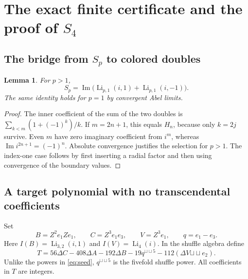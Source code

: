 \documentclass[11pt,letterpaper]{article}
\numberwithin{equation}{section}
\newtheorem{lemma}[theorem]{Lemma}
\theoremstyle{definition}
\DeclareMathOperator{\Li}{Li}
\DeclareMathOperator{\Imag}{Im}
\newcommand{\sh}{\mathbin{\sha}}
\providecommand{\sha}{\mathbin{\sqcup\!\sqcup}}
\begin{document}
\section{The exact finite certificate and the proof of \texorpdfstring{$S_4$}{S4}}
\label{sec:certificate}

\subsection{The bridge from \texorpdfstring{$S_p$}{Sp} to colored doubles}
\begin{lemma}\label{lem:bridge}
For $p>1$,
\begin{equation}
 S_p=\Imag\bigl(\Li_{p,1}(i,1)+\Li_{p,1}(i,-1)\bigr).
 \label{eq:bridge}
\end{equation}
The same identity holds for $p=1$ by convergent Abel limits.
\end{lemma}
\begin{proof}
The inner coefficient of the sum of the two doubles is
$\sum_{k<m}(1+(-1)^k)/k$. If $m=2n+1$, this equals $H_n$,
because only $k=2j$ survive. Even $m$ have zero imaginary coefficient
from $i^m$, whereas $\Imag i^{2n+1}=(-1)^n$. Absolute convergence
justifies the selection for $p>1$. The index-one case follows by first
inserting a radial factor and then using convergence of the boundary
values.
\end{proof}

\subsection{A target polynomial with no transcendental coefficients}
Set
\begin{equation}
 B=Z^2e_1Ze_1,
 \qquad C=Z^3e_1e_3,
 \qquad V=Z^3e_1,
 \qquad q=e_1-e_3.
 \label{eq:targetletters}
\end{equation}
Here $I(B)=\Li_{3,2}(i,1)$ and $I(V)=\Li_4(i)$.
In the shuffle algebra define
\begin{equation}
 T=56\Delta C-408\Delta A-192\Delta B
       -19q^{\sh5}-112(\Delta V\sh e_2).
 \label{eq:T}
\end{equation}
Unlike the powers in \eqref{eq:seed}, $q^{\sh5}$ is the fivefold shuffle
power. All coefficients in $T$ are integers.
\end{document}
